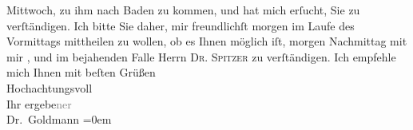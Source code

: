 \begin{ledgroupsized}[t]{13cm}
                  Mittwoch, zu ihm nach Baden zu kommen,
               und hat mich erſucht, Sie zu verſtändigen. Ich bitte Sie daher, mir freundlichſt
                  morgen im Laufe des Vormittags
               mittheilen zu {\pb}wollen, ob es Ihnen möglich iſt,
                  morgen{ }Nachmittag mit mir \label{K_L02641-1v}\label{K_L02641-1h}, und im bejahenden Falle Herrn \textsc{Dr. Spitzer} zu verſtändigen.\pend
           \pstart
           Ich empfehle mich Ihnen mit beſten Grüßen {\\[\baselineskip]}Hochachtungsvoll {\\[\baselineskip]}Ihr
                  ergebe\textcolor{gray}{ner}{\\[\baselineskip]}\spacefill\mbox{Dr. Goldmann}\pend
           \leftskip=0em{}
         
         \endnumbering{}\end{ledgroupsized}  \newcommand{\dateiname}{L02641}\newcommand{\titel}{Paul Goldmann an Arthur Schnitzler, 25. 6. 1889}\newcommand{\editorInnen}{Martin Anton Müller und Laura Untner}
      